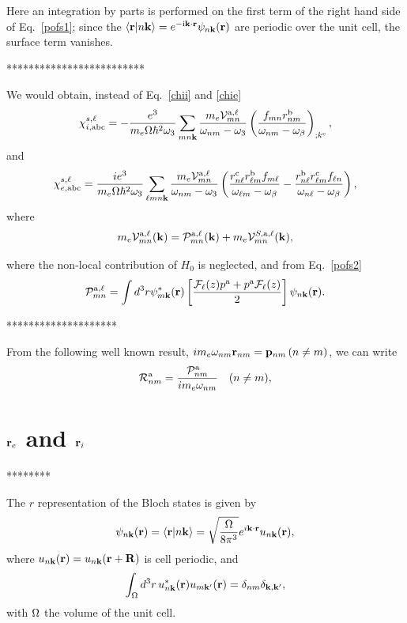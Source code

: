 \documentclass[floatfix,prb,aps,superscriptaddress,11pt,preprint]{revtex4}
\begin{document}
Here an integration by parts is performed on the first term of the
right hand side of Eq.~\eqref{pofs1}; since the
$\langle {\mathbf{r}} | {n\mathbf{k}} \rangle=e^{-\mathrm{i}\mathbf{k}\cdot\mathbf{r}}\psi_{n\mathbf{k}}(\mathbf{r})$ 
are periodic over the unit cell, the surface term vanishes. 

*************************

We would obtain,
instead of Eq.~\eqref{chii} and \eqref{chie}
\begin{equation}\label{chiinl}
\chi_{i,\mathrm{a}\mathrm{b}\mathrm{c}}^{s,\ell}=-\frac{e^3}{m_e\Omega\hbar^2\omega_3}\sum_{mn\mathbf{k}}
\frac{m_e{\cal V}_{mn}^{\mathrm{a},\ell}}{\omega_{nm}-\omega_3}
\left(\frac{f_{mn}r_{nm}^{\mathrm{b}}}{\omega_{nm}-\omega_\beta}\right)_{;k^{\mathrm{c}}},
\end{equation}
and
\begin{equation}\label{chienl}
\chi_{e,\mathrm{a}\mathrm{b}\mathrm{c}}^{s,\ell}=\frac{ie^3}{m_e\Omega\hbar^2\omega_3}\sum_{\ell mn\mathbf{k}}
\frac{m_e{\cal V}_{mn}^{\mathrm{a},\ell}}{\omega_{nm}-\omega_3}
\left(
\frac{r_{n\ell}^{\mathrm{c}} r_{\ell m}^{\mathrm{b}}
f_{m\ell}}{\omega_{\ell m}-\omega_\beta}
-\frac{r_{n\ell}^{\mathrm{b}} r_{\ell m}^{\mathrm{c}}
f_{\ell n}}{\omega_{n \ell}-\omega_\beta}
\right),
\end{equation}
where
\begin{eqnarray}\label{nl.5}
m_e{\cal V}_{mn}^{\mathrm{a},\ell}(\mathbf{k})=
{\cal P}^{\mathrm{a},\ell}_{mn}(\mathbf{k})
+
m_e{\cal V}^{S,\mathrm{a},\ell}_{mn}(\mathbf{k})
,
\end{eqnarray}



where the non-local contribution of $H_0$ is neglected, and from Eq.~\eqref{pofs2}
\begin{equation}\label{calpmn}
{\mathbf{\cal P}}_{mn}^{\mathrm{a},\ell}=\int d^3 r
\psi^*_{m\mathbf{k}}(\mathbf{r})
\left[\frac{{\mathbf{\cal F}}_\ell(z) p^{\mathrm{a}} +
p^{\mathrm{a}} {\mathbf{\cal F}}_\ell(z)}{2}\right]
\psi_{n\mathbf{k}}(\mathbf{r}).
\end{equation}

********************

From the following well known result,
$im_e\omega_{nm}\mathbf{r}_{nm}=\mathbf{p}_{nm}\,(n\neq m)$, 
we can write
\begin{equation}\label{rcal}
{\cal R}^{\mathrm{a}}_{nm}=\frac{{\cal P}^{\mathrm{a}}_{nm}}{im_e\omega_{nm}}\quad(n\neq m)
,
\end{equation} 

\section{$\mathbf{r}_e$ and $\mathbf{r}_i$}
********

The $r$ representation of the
Bloch states is given by
\begin{equation}\label{bloch}
\psi_{n\mathbf{k}}(\mathbf{r})=\langle {\mathbf{r}} | {n\mathbf{k}} \rangle=\sqrt{\frac{\Omega}{8\pi^3}}
e^{i\mathbf{k} \cdot \mathbf{r}}u_{n\mathbf{k}}(\mathbf{r})
,
\end{equation}
where
$u_{n\mathbf{k}}(\mathbf{r})=u_{n\mathbf{k}}(\mathbf{r}+\mathbf{R})$ is cell periodic, and
\begin{equation}\label{normal}
\int_{\Omega}d^{3}r\, u_{n\mathbf{k}}^{*}(\mathbf{r})u_{m\mathbf{k}'}(\mathbf{r})=\delta_{nm}\delta_{\mathbf{\mathbf{k},\mathbf{k}'}}
,
\end{equation}
with $\Omega$ the volume of the unit cell.
\end{document}
